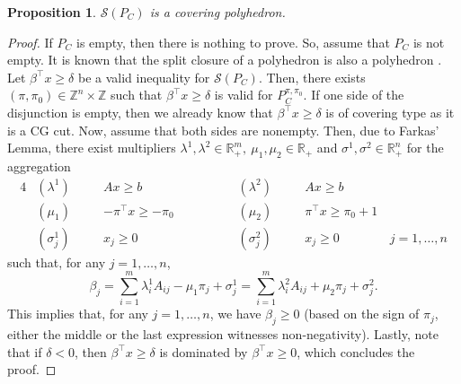\documentclass[11pt]{article}
\newcommand{\Z}{\mathbb{Z}}
\newcommand{\R}{\mathbb{R}}
\renewcommand{\S}{\mathcal{S}}
\newcommand{\bpar}{\beta}
\newtheorem{proposition}{Proposition}
\newcommand{\cred}{\color{black}}
\begin{document}
\begin{proposition} 
\label{prop:CoveringPoly}
$\S(P_C)$ is a covering polyhedron. 
\end{proposition}	
\begin{proof}
If $P_C$ is empty, then there is nothing to prove. So, assume that $P_C$ is not empty. It is known that the split closure of a polyhedron is also a polyhedron \cite{cook:ka:sc:1990}. Let $\bpar^\top x \geq \delta$ be a valid inequality for $\S(P_C)$. Then, there exists $(\pi,\pi_0) \in \Z^n \times \Z$ such that $\bpar^\top x \geq \delta$ is valid for $P_C^{\pi,\pi_0}$. If one side of the disjunction is empty, then we already know that $\bpar^\top x \geq \delta$ is of covering type as it is a CG cut. Now, assume that both sides are nonempty. Then, due to Farkas' Lemma, there exist multipliers $\lambda^1, \lambda^2 \in \R_+^m, \ \mu_1, \mu_2 \in \R_+$ and $\sigma^1, \sigma^2 \in \R_+^n$ 
for the aggregation
\begin{alignat*}{4}
& (\lambda^1) \quad  && Ax \geq b \qquad \qquad \qquad && (\lambda^2) \quad && Ax \geq b \\
& (\mu_1) && - \pi^\top x \geq -\pi_0 && (\mu_2) && \pi^\top x \geq \pi_0 +1 \\
& (\sigma^1_j) && x_j \geq 0 && (\sigma^2_j) && x_j \geq 0 \qquad \qquad j=1,\hdots,n
\end{alignat*}
such that, for any $j=1,\hdots,n$, 
\begin{equation}
\label{eq:cSplit}
\bpar_j  = \sum_{i=1}^m \lambda^1_i A_{ij} - \mu_1 \pi_j + \sigma^1_j = \sum_{i=1}^m \lambda^2_i A_{ij} + \mu_2 \pi_j + \sigma^2_j.
\end{equation}
This implies that, for any $j=1,\hdots,n$, we have $\bpar_j \geq 0$ (based on the sign of $\pi_j$, either the middle or the last expression {\cred witnesses non-negativity}). Lastly, note that if $\delta < 0$, then $\bpar^\top x \geq \delta$ is dominated by $\bpar^\top x \geq 0$, which concludes the proof.
\end{proof}
\end{document}
